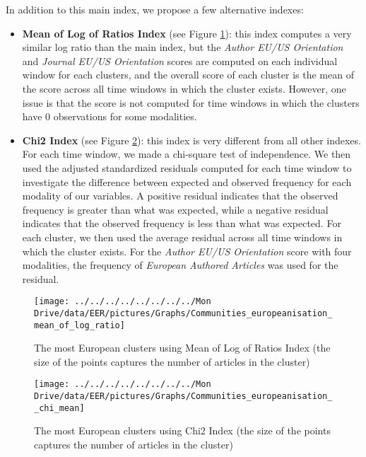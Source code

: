 \documentclass[
  12pt,
  onecolumn]{article}
\providecommand{\tightlist}{%
  \setlength{\itemsep}{0pt}\setlength{\parskip}{0pt}}
\begin{document}
In addition to this main index, we propose a few alternative indexes:

\begin{itemize}
\tightlist
\item
  \textbf{Mean of Log of Ratios Index} (see Figure \ref{fig:plot-mean-log-ratios}): this index computes a very similar log ratio than the main index, but the \emph{Author EU/US Orientation} and \emph{Journal EU/US Orientation} scores are computed on each individual window for each clusters, and the overall score of each cluster is the mean of the score across all time windows in which the cluster exists. However, one issue is that the score is not computed for time windows in which the clusters have 0 observations for some modalities.
\item
  \textbf{Chi2 Index} (see Figure \ref{fig:plot-chi-two-mean}): this index is very different from all other indexes. For each time window, we made a chi-square test of independence. We then used the adjusted standardized residuals computed for each time window to investigate the difference between expected and observed frequency for each modality of our variables. A positive residual indicates that the observed frequency is greater than what was expected, while a negative residual indicates that the observed frequency is less than what was expected. For each cluster, we then used the average residual across all time windows in which the cluster exists. For the \emph{Author EU/US Orientation} score with four modalities, the frequency of \emph{European Authored Articles} was used for the residual.
\end{itemize}

\begin{figure}[H]

{\centering \texttt{[image: ../../../../../../../../Mon Drive/data/EER/pictures/Graphs/Communities\_europeanisation\_mean\_of\_log\_ratio]} 

}

\caption{The most European clusters using Mean of Log of Ratios Index (the size of the points captures the number of articles in the cluster)}\label{fig:plot-mean-log-ratios}
\end{figure}

\begin{figure}[H]

{\centering \texttt{[image: ../../../../../../../../Mon Drive/data/EER/pictures/Graphs/Communities\_europeanisation\_\_chi\_mean]} 

}

\caption{The most European clusters using Chi2 Index (the size of the points captures the number of articles in the cluster)}\label{fig:plot-chi-two-mean}
\end{figure}
\end{document}
